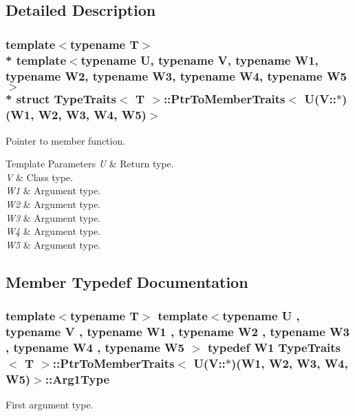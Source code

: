 \subsection{Detailed Description}
\subsubsection*{template$<$typename T$>$\\*
template$<$typename U, typename V, typename W1, typename W2, typename W3, typename W4, typename W5$>$\\*
struct Type\+Traits$<$ T $>$\+::\+Ptr\+To\+Member\+Traits$<$ U(\+V\+::$\ast$)(\+W1, W2, W3, W4, W5)$>$}

Pointer to member function. 
\begin{DoxyTemplParams}{Template Parameters}
{\em U} & Return type. \\
\hline
{\em V} & Class type. \\
\hline
{\em W1} & Argument type. \\
\hline
{\em W2} & Argument type. \\
\hline
{\em W3} & Argument type. \\
\hline
{\em W4} & Argument type. \\
\hline
{\em W5} & Argument type. \\
\hline
\end{DoxyTemplParams}


\subsection{Member Typedef Documentation}
\subsubsection[{\texorpdfstring{Arg1\+Type}{Arg1Type}}]{\setlength{\rightskip}{0pt plus 5cm}template$<$typename T$>$ template$<$typename U , typename V , typename W1 , typename W2 , typename W3 , typename W4 , typename W5 $>$ typedef W1 {\bf Type\+Traits}$<$ T $>$\+::{\bf Ptr\+To\+Member\+Traits}$<$ U(V\+::$\ast$)(W1, W2, W3, W4, W5)$>$\+::{\bf Arg1\+Type}}\hypertarget{structTypeTraits_1_1PtrToMemberTraits_3_01U_07V_1_1_5_08_07W1_00_01W2_00_01W3_00_01W4_00_01W5_08_4_a3182e73cd00d90bfdaff55f3f27a5b20}{}\label{structTypeTraits_1_1PtrToMemberTraits_3_01U_07V_1_1_5_08_07W1_00_01W2_00_01W3_00_01W4_00_01W5_08_4_a3182e73cd00d90bfdaff55f3f27a5b20}
First argument type. 
